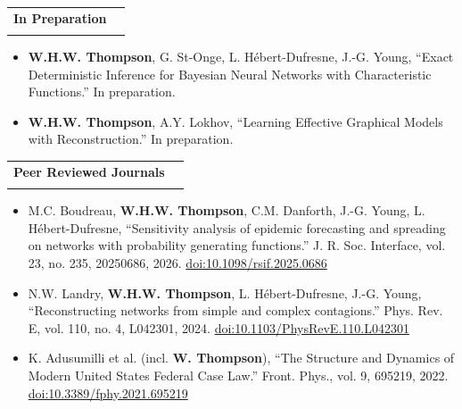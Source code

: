 \documentclass[letterpaper,11pt]{article}
\makeatletter
\newcommand{\resumeItem}[1]{
  \item\small{
    {#1 \vspace{-2pt}}
  }
}
\newcommand{\resumeSubheading}[4]{
  \vspace{-2pt}\item
    \begin{tabular*}{0.97\textwidth}[t]{l@{\extracolsep{\fill}}r}
      \textbf{#1} & #2 \\
      \textit{\small#3} & \textit{\small #4} \\
    \end{tabular*}\vspace{-7pt}
}
\newcommand{\resumeItemListStart}{\begin{itemize}}
\newcommand{\resumeItemListEnd}{\end{itemize}\vspace{-5pt}}
\newcommand{\me}[1]{\textbf{#1}}
\makeatother
\begin{document}
  \resumeSubheading{In Preparation}{}{}{}
    \resumeItemListStart
      \resumeItem{\me{W.H.W. Thompson}, G. St-Onge, L. H\'ebert-Dufresne, J.-G. Young, ``Exact Deterministic Inference for Bayesian Neural Networks with Characteristic Functions.'' In preparation.}
      \resumeItem{\me{W.H.W. Thompson}, A.Y. Lokhov, ``Learning Effective Graphical Models with Reconstruction.'' In preparation.}
    \resumeItemListEnd

  \resumeSubheading{Peer Reviewed Journals}{}{}{}
    \resumeItemListStart
      \resumeItem{M.C. Boudreau, \me{W.H.W. Thompson}, C.M. Danforth, J.-G. Young, L. H\'ebert-Dufresne, ``Sensitivity analysis of epidemic forecasting and spreading on networks with probability generating functions.'' J. R. Soc. Interface, vol. 23, no. 235, 20250686, 2026. \href{https://doi.org/10.1098/rsif.2025.0686}{doi:10.1098/rsif.2025.0686}}
      \resumeItem{N.W. Landry, \me{W.H.W. Thompson}, L. H\'ebert-Dufresne, J.-G. Young, ``Reconstructing networks from simple and complex contagions.'' Phys. Rev. E, vol. 110, no. 4, L042301, 2024. \href{https://doi.org/10.1103/PhysRevE.110.L042301}{doi:10.1103/PhysRevE.110.L042301}}
      \resumeItem{K. Adusumilli et al. (incl. \me{W. Thompson}), ``The Structure and Dynamics of Modern United States Federal Case Law.'' Front. Phys., vol. 9, 695219, 2022. \href{https://doi.org/10.3389/fphy.2021.695219}{doi:10.3389/fphy.2021.695219}}
    \resumeItemListEnd
\end{document}
